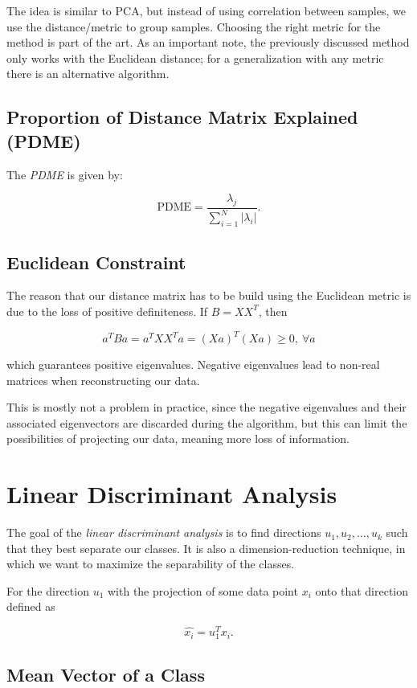 The idea is similar to PCA, but instead of using correlation between samples, we use the distance/metric to group samples. Choosing the right
metric for the method is part of the art. As an important note, the previously discussed method only works with the Euclidean distance; for a generalization with any metric
there is an alternative algorithm.

\subsection{Proportion of Distance Matrix Explained (PDME)}

The \emph{PDME} is given by: 

\[
	\mathrm{PDME} = \frac{\lambda_j}{\sum_{i = 1}^{N} | \lambda_i |}.
\]

\subsection{Euclidean Constraint}

The reason that our distance matrix has to be build using the Euclidean metric is due to the loss of positive definiteness. If \(B = XX^T\), then

\[
	a^T B a = a^T XX^T a = (Xa)^T(Xa) \ge 0, \ \forall a
\]

which guarantees positive eigenvalues. Negative eigenvalues lead to non-real matrices when reconstructing our data.

This is mostly not a problem in practice, since the negative eigenvalues and their associated eigenvectors are discarded during the algorithm, but
this can limit the possibilities of projecting our data, meaning more loss of information.

\section{Linear Discriminant Analysis}

The goal of the \emph{linear discriminant analysis} is to find directions \(u_1, u_2, \ldots, u_k\) such that they best separate 
our classes. It is also a dimension-reduction technique, in which we want to maximize the separability of the classes.

For the direction \(u_1\) with the projection of some data point \(x_i\) onto that direction defined as

\[
	\hat{x_i} = u_1^T x_i.
\]

\subsection{Mean Vector of a Class}

